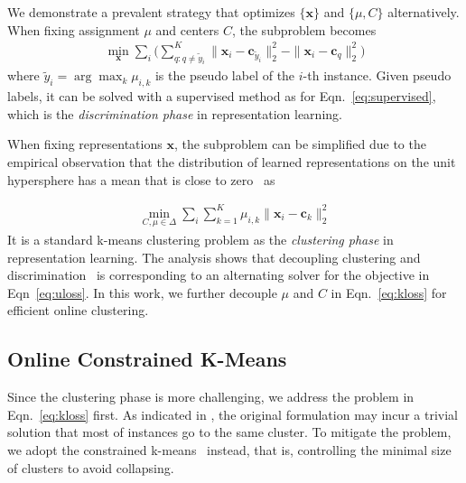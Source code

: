 \documentclass[10pt,twocolumn,letterpaper]{article}
\def \x {\mathbf{x}}
\def \cc {\mathbf{c}}
\begin{document}
We demonstrate a prevalent strategy that optimizes $\{\x\}$ and $\{\mu,C\}$ alternatively. When fixing assignment $\mu$ and centers $C$, the subproblem becomes
\begin{eqnarray*}
\min_{\x}  \sum_{i}\big(\sum_{q:q\not= \tilde{y}_i}^K \|\x_i-\cc_{\tilde{y}_i}\|_2^2 -  \|\x_i-\cc_q\|_2^2\big)
\end{eqnarray*}
where $\tilde{y}_i=\arg\max_k\mu_{i,k}$ is the pseudo label of the $i$-th instance. Given pseudo labels, it can be solved with a supervised method as for Eqn.~\ref{eq:supervised}, which is the \textit{discrimination phase} in representation learning.

When fixing representations $\x$, the subproblem can be simplified due to the empirical observation that the distribution of learned representations on the unit hypersphere has a mean that is close to zero~\cite{0001I20} as

\begin{eqnarray}\label{eq:kloss}
\min_{C,\mu\in \Delta}  \sum_{i} \sum_{k=1}^K \mu_{i,k}\|\x_i-\cc_k\|_2^2
\end{eqnarray}
It is a standard k-means clustering problem as the \textit{clustering phase} in representation learning. The analysis shows that decoupling clustering and discrimination~\cite{CaronBJD18, CaronMMGBJ20} is corresponding to an alternating solver for the objective in Eqn~\ref{eq:uloss}. In this work, we further decouple $\mu$ and $C$ in Eqn.~\ref{eq:kloss} for efficient online clustering.

\subsection{Online Constrained K-Means}
Since the clustering phase is more challenging, we address the problem in Eqn.~\ref{eq:kloss} first. As indicated in \cite{AsanoRV20a}, the original formulation may incur a trivial solution that most of instances go to the same cluster. To mitigate the problem, we adopt the constrained k-means~\cite{bradley2000constrained} instead, that is, controlling the minimal size of clusters to avoid collapsing.
\end{document}
